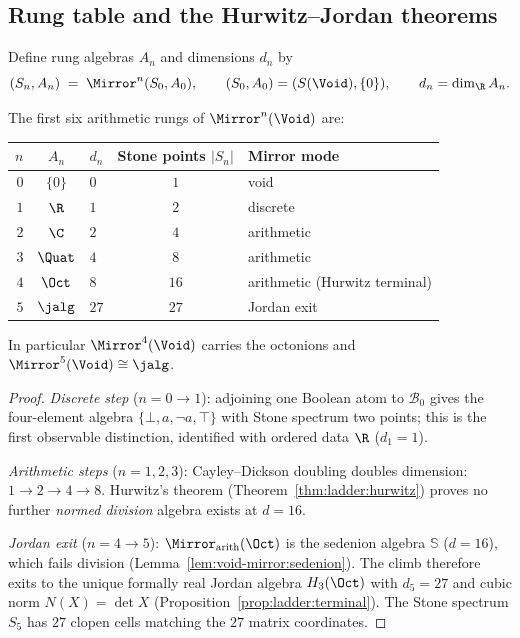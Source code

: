 \subsection{Rung table and the Hurwitz--Jordan theorems}
\label{sec:void-mirror:rungs}

\begin{definition}\label{def:void-mirror:power}
Define rung algebras $A_n$ and dimensions $d_n$ by
\begin{equation}\label{eq:void-mirror:power}
  (S_n,A_n)\;=\;\Mirror^n(S_0,A_0),
  \qquad (S_0,A_0)=(S(\Void),\{0\}),
  \qquad d_n=\dim_{\R} A_n.
\end{equation}
\end{definition}

\begin{theorem}\label{thm:void-mirror:table}
The first six arithmetic rungs of $\Mirror^n(\Void)$ are:
\begin{center}
\renewcommand{\arraystretch}{1.2}
\begin{tabular}{@{}rclcl@{}}
\toprule
$n$ & $A_n$ & $d_n$ & Stone points $|S_n|$ & Mirror mode \\
\midrule
$0$ & $\{0\}$ & $0$ & $1$ & void \\
$1$ & $\R$ & $1$ & $2$ & discrete \\
$2$ & $\C$ & $2$ & $4$ & arithmetic \\
$3$ & $\Quat$ & $4$ & $8$ & arithmetic \\
$4$ & $\Oct$ & $8$ & $16$ & arithmetic (Hurwitz terminal) \\
$5$ & $\jalg$ & $27$ & $27$ & Jordan exit \\
\bottomrule
\end{tabular}
\end{center}
In particular $\Mirror^4(\Void)$ carries the octonions and
$\Mirror^5(\Void)\cong\jalg$.
\end{theorem}

\begin{proof}
\emph{Discrete step} ($n=0\to1$): adjoining one Boolean atom to $\mathcal{B}_0$
gives the four-element algebra $\{\bot,a,\neg a,\top\}$ with Stone spectrum
two points; this is the first observable distinction, identified with ordered
data $\R$ ($d_1=1$).

\emph{Arithmetic steps} ($n=1,2,3$): Cayley--Dickson doubling doubles
dimension: $1\to2\to4\to8$. Hurwitz's theorem
(Theorem~\ref{thm:ladder:hurwitz}) proves no further \emph{normed division}
algebra exists at $d=16$.

\emph{Jordan exit} ($n=4\to5$): $\Mirror_{\mathrm{arith}}(\Oct)$ is the
sedenion algebra $\mathbb{S}$ ($d=16$), which fails division
(Lemma~\ref{lem:void-mirror:sedenion}). The climb therefore exits to the
unique formally real Jordan algebra $H_3(\Oct)$ with $d_5=27$ and cubic norm
$N(X)=\det X$ (Proposition~\ref{prop:ladder:terminal}). The Stone spectrum
$S_5$ has $27$ clopen cells matching the $27$ matrix coordinates.
\end{proof}

